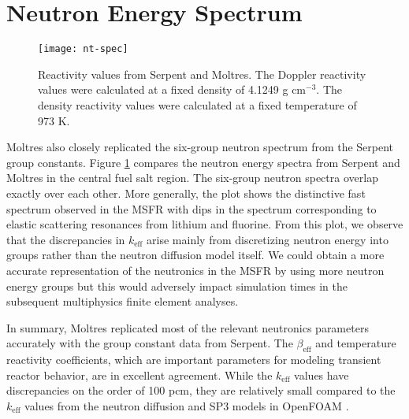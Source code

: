 \section{Neutron Energy Spectrum}

\begin{figure}[htb!]
    \centering
    \texttt{[image: nt-spec]}
    \caption{Reactivity values from Serpent and Moltres. The Doppler
    reactivity values were calculated at a fixed density of 4.1249 g
    cm$^{-3}$. The density reactivity values were calculated at a fixed
    temperature of 973 K.}
    \label{fig:ntspec}
\end{figure}

Moltres also closely replicated the six-group neutron spectrum from the
Serpent group constants. Figure \ref{fig:ntspec} compares the neutron energy
spectra from Serpent and Moltres in the central fuel salt region. The
six-group neutron spectra overlap exactly over each other. More generally, the
plot shows the distinctive fast spectrum observed in the \gls{MSFR} with dips
in the spectrum corresponding to elastic scattering resonances from lithium
and fluorine. From this plot, we observe that the discrepancies in
$k_{\text{eff}}$ arise mainly from discretizing neutron energy into groups
rather than the neutron diffusion model itself. We could obtain a more
accurate representation of the neutronics in the \gls{MSFR} by using more
neutron energy groups but this would adversely impact simulation times in the
subsequent multiphysics finite element analyses.

In summary, Moltres replicated most of the relevant neutronics parameters
accurately with the group constant data from Serpent. The $\beta_{\text{eff}}$
and temperature reactivity coefficients, which are important
parameters for modeling transient reactor behavior, are in excellent
agreement. While the
$k_{\text{eff}}$ values have discrepancies on the order of 100 pcm, they are
relatively small compared to the $k_{\text{eff}}$ values from the neutron
diffusion and SP3 models in OpenFOAM \cite{cervi_development_2019}.
